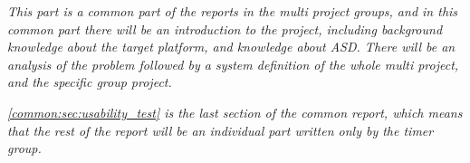\textit{This part is a common part of the reports in the multi project groups, and in this common part there will be an introduction to the project, including background knowledge about the target platform, and knowledge about ASD. There will be an analysis of the problem followed by a system definition of the whole multi project, and the specific group project.}

\textit{\autoref{common:sec:usability_test} is the last section of the common report, which means that the rest of the report will be an individual part written only by the timer group.}